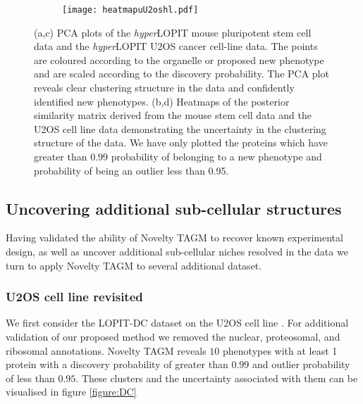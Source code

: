 \documentclass[12pt,english]{article}
\begin{document}
\begin{figure}[ht]
\begin{subfigure}[t]{0.5\textwidth}
	\centering
	\texttt{[image: heatmapuU2oshl.pdf]}
	\caption{}
\end{subfigure}
	\caption{(a,c) PCA plots of the \textit{hyper}LOPIT mouse pluripotent stem cell data and the \textit{hyper}LOPIT U2OS cancer cell-line data. The points are coloured according to the organelle or proposed new phenotype and are scaled according to the discovery probability. The PCA plot reveals clear clustering structure in the data and confidently identified new phenotypes. (b,d) Heatmaps of the posterior similarity matrix derived from the mouse stem cell data and the U2OS cell line data demonstrating the uncertainty in the clustering structure of the data. We have only plotted the proteins which have greater than 0.99 probability of belonging to a new phenotype and probability of being an outlier less than 0.95.}
	\label{figure:mouse}
\end{figure}
\clearpage
\subsection{Uncovering additional sub-cellular structures}
Having validated the ability of Novelty TAGM to recover known experimental design, as well as uncover additional sub-cellular niches resolved in the data we turn to apply Novelty TAGM to several additional dataset.

\subsubsection{U2OS cell line revisited}
 We first consider the LOPIT-DC dataset on the U2OS cell line \citep{DC:2018}. For additional validation of our proposed method we removed the nuclear, proteosomal, and ribosomal annotations. Novelty TAGM reveals $10$ phenotypes with at least 1 protein with a discovery probability of greater than $0.99$ and outlier probability of less than $0.95$. These clusters and the uncertainty associated with them can be visualised in figure \ref{figure:DC}
\end{document}
